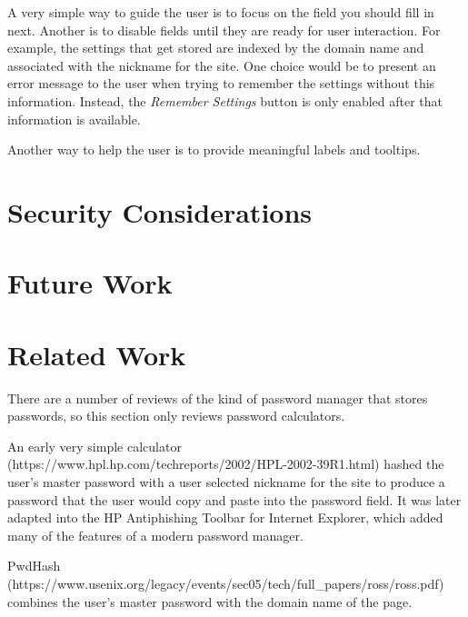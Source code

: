 A very simple way to guide the user is to focus on the field you should fill in next.
Another is to disable fields until they are ready for user interaction.  For example,
the settings that get stored are indexed by the domain name and associated with
the nickname for the site. One choice would be to present an error message to the
user when trying to remember the settings without this information.  Instead, the 
{\em Remember Settings} button is only enabled after that information is available.

Another way to help the user is to provide meaningful labels and tooltips.

\section{Security Considerations}\label{security}

\section{Future Work}\label{improvement}

\section{Related Work}\label{related}

There are a number of reviews of the kind of password manager
that stores passwords, so this section only reviews password calculators.

An early very simple calculator (https://www.hpl.hp.com/techreports/2002/HPL-2002-39R1.html)
hashed the user's master password with a user selected nickname for the site to
produce a password that the user would copy and paste into the password field.  It was 
later adapted into the HP Antiphishing Toolbar for Internet Explorer, which added many
of the features of a modern password manager.

PwdHash (https://www.usenix.org/legacy/events/sec05/tech/full\_papers/ross/ross.pdf) 
combines the user's master password with the domain name of the page.

